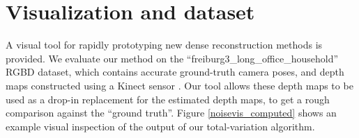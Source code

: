 \documentclass[conference]{IEEEtran}
\begin{document}


\section{Visualization and dataset}
A visual tool for rapidly prototyping new dense reconstruction methods is provided.
We evaluate our method on the ``freiburg3\_long\_office\_household'' RGBD dataset, which contains accurate ground-truth camera poses, and
depth maps constructed using a Kinect sensor \cite{dataset} \cite{largescale}. Our tool allows these depth maps to be used as a drop-in replacement for the estimated
depth maps, to get a rough comparison against the ``ground truth''. Figure \ref{noisevis_computed} shows an example visual inspection of the output
of our total-variation algorithm.
\end{document}
